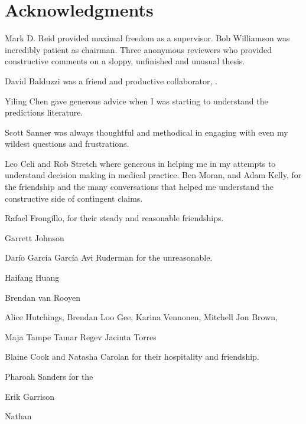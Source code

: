 \chapter*{Acknowledgments}

Mark D. Reid provided maximal freedom as a supervisor.
Bob Williamson was incredibly patient as chairman.
Three anonymous reviewers who provided constructive comments on a sloppy, unfinished and unusual thesis. 

David Balduzzi was a friend and productive collaborator, .

Yiling Chen gave generous advice when I was starting to understand the predictions literature.

Scott Sanner was always thoughtful and methodical in engaging with even my wildest questions and frustrations.



Leo Celi and Rob Stretch where generous in helping me in my attempts to understand decision making in medical practice.
Ben Moran, and Adam Kelly, for the friendship and the many conversations that helped me understand the constructive side of contingent claims.

Rafael Frongillo, for their steady and reasonable friendships.

Garrett Johnson
 
Dar\'io Garc\'ia Garc\'ia
Avi Ruderman for the unreasonable.

Haifang Huang

Brendan van Rooyen  

Alice Hutchings, Brendan Loo Gee, Karina Vennonen, Mitchell Jon Brown, 

Maja Tampe
Tamar Regev
Jacinta Torres


Blaine Cook and Natasha Carolan for their hospitality and friendship.


Pharoah Sanders for the 

Erik Garrison

Nathan 

